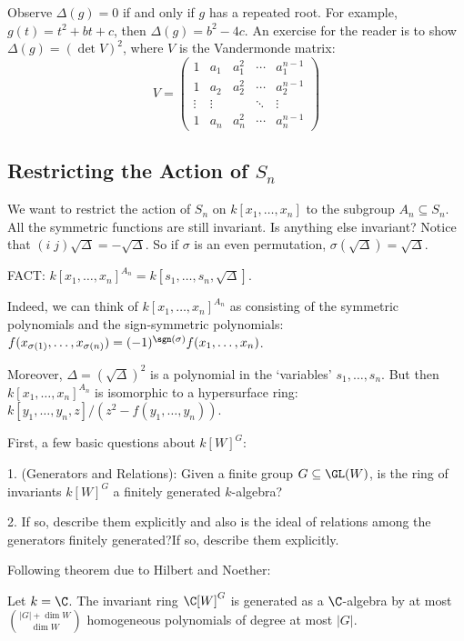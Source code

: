 Observe $\Delta(g)=0$ if and only if $g$ has a repeated root. For example, $g(t)=t^2+bt+c$, then $\Delta(g)= b^2-4c$. An exercise for the reader is to show $\Delta(g)= (\det V)^2$, where $V$ is the Vandermonde matrix:
	\[
	V=
	\begin{pmatrix}
	1 & a_1 & a_1^2 & \cdots & a_1^{n-1} \\
	1 & a_2 & a_2^2 & \cdots & a_2^{n-1} \\
	\vdots & \vdots & & \ddots & \vdots \\
	1 & a_n & a_n^2 & \cdots & a_n^{n-1}
	\end{pmatrix}
	\]




\subsection{Restricting the Action of $S_n$}

We want to restrict the action of $S_n$ on $k[x_1,\ldots,x_n]$ to the subgroup $A_n \subseteq S_n$. All the symmetric functions are still invariant. Is anything else invariant? Notice that $(i\;j)\sqrt{\Delta}= - \sqrt{\Delta}$. So if $\sigma$ is an even permutation, $\sigma(\sqrt{\Delta})= \sqrt{\Delta}$.

FACT: $k[x_1,\ldots,x_n]^{A_n}= k[s_1,\ldots,s_n,\sqrt{\Delta}]$.


Indeed, we can think of $k[x_1,\ldots,x_n]^{A_n}$ as consisting of the symmetric polynomials and the sign-symmetric polynomials: $f(x_{\sigma(1)},\ldots,x_{\sigma(n)})= (-1)^{\sgn(\sigma)} f(x_1,\ldots,x_n)$. 


Moreover, $\Delta= (\sqrt{\Delta})^2$ is a polynomial in the `variables' $s_1,\ldots,s_n$. But then $k[x_1,\ldots,x_n]^{A_n}$ is isomorphic to a hypersurface ring: $k[y_1,\ldots,y_n,z]/(z^2-f(y_1,\ldots,y_n))$. 




First, a few basic questions about $k[W]^G$:

1. (Generators and Relations): Given a finite group $G \subseteq \GL(W)$, is the ring of invariants $k[W]^G$ a finitely generated $k$-algebra? 

2. If so, describe them explicitly and also is the ideal of relations among the generators finitely generated?If so, describe them explicitly.

Following theorem due to Hilbert and Noether:

\begin{thm}
Let $k=\C$. The invariant ring $\C[W]^G$ is generated as a $\C$-algebra by at most $\binom{|G|+\dim W}{\dim W}$ homogeneous polynomials of degree at most $|G|$. 
\end{thm}


